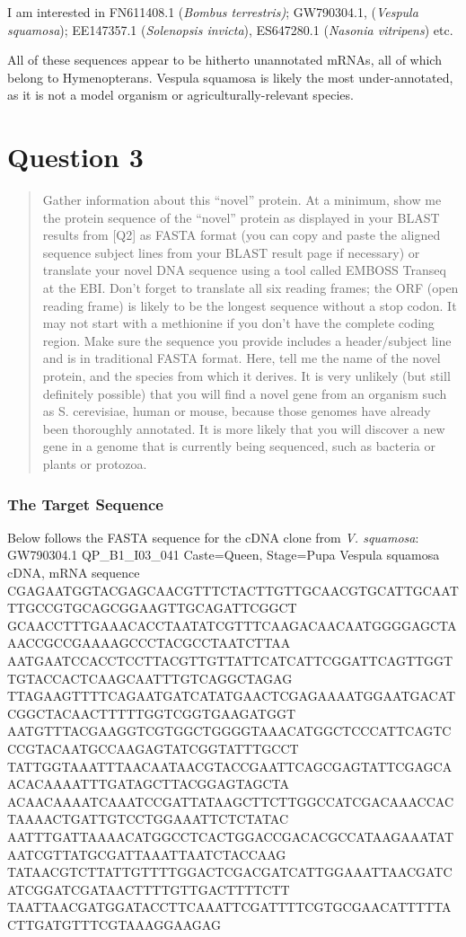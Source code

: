 \documentclass[]{article}
\begin{document}
I am interested in FN611408.1 (\emph{Bombus terrestris)}; GW790304.1,
(\emph{Vespula squamosa}); EE147357.1 (\emph{Solenopsis invicta}),
ES647280.1 (\emph{Nasonia vitripens}) etc.

All of these sequences appear to be hitherto unannotated mRNAs, all of
which belong to Hymenopterans. Vespula squamosa is likely the most
under-annotated, as it is not a model organism or
agriculturally-relevant species.

\section{Question 3}\label{question-3}

\begin{quote}
Gather information about this ``novel'' protein. At a minimum, show me
the protein sequence of the ``novel'' protein as displayed in your BLAST
results from {[}Q2{]} as FASTA format (you can copy and paste the
aligned sequence subject lines from your BLAST result page if necessary)
or translate your novel DNA sequence using a tool called EMBOSS Transeq
at the EBI. Don't forget to translate all six reading frames; the ORF
(open reading frame) is likely to be the longest sequence without a stop
codon. It may not start with a methionine if you don't have the complete
coding region. Make sure the sequence you provide includes a
header/subject line and is in traditional FASTA format. Here, tell me
the name of the novel protein, and the species from which it derives. It
is very unlikely (but still definitely possible) that you will find a
novel gene from an organism such as S. cerevisiae, human or mouse,
because those genomes have already been thoroughly annotated. It is more
likely that you will discover a new gene in a genome that is currently
being sequenced, such as bacteria or plants or protozoa.
\end{quote}

\subsubsection{The Target Sequence}\label{the-target-sequence}

Below follows the FASTA sequence for the cDNA clone from \emph{V.
squamosa}: GW790304.1 QP\_B1\_I03\_041 Caste=Queen, Stage=Pupa Vespula
squamosa cDNA, mRNA sequence
CGAGAATGGTACGAGCAACGTTTCTACTTGTTGCAACGTGCATTGCAATTTGCCGTGCAGCGGAAGTTGCAGATTCGGCT
GCAACCTTTGAAACACCTAATATCGTTTCAAGACAACAATGGGGAGCTAAACCGCCGAAAAGCCCTACGCCTAATCTTAA
AATGAATCCACCTCCTTACGTTGTTATTCATCATTCGGATTCAGTTGGTTGTACCACTCAAGCAATTTGTCAGGCTAGAG
TTAGAAGTTTTCAGAATGATCATATGAACTCGAGAAAATGGAATGACATCGGCTACAACTTTTTGGTCGGTGAAGATGGT
AATGTTTACGAAGGTCGTGGCTGGGGTAAACATGGCTCCCATTCAGTCCCGTACAATGCCAAGAGTATCGGTATTTGCCT
TATTGGTAAATTTAACAATAACGTACCGAATTCAGCGAGTATTCGAGCAACACAAAATTTGATAGCTTACGGAGTAGCTA
ACAACAAAATCAAATCCGATTATAAGCTTCTTGGCCATCGACAAACCACTAAAACTGATTGTCCTGGAAATTCTCTATAC
AATTTGATTAAAACATGGCCTCACTGGACCGACACGCCATAAGAAATATAATCGTTATGCGATTAAATTAATCTACCAAG
TATAACGTCTTATTGTTTTGGACTCGACGATCATTGGAAATTAACGATCATCGGATCGATAACTTTTGTTGACTTTTCTT
TAATTAACGATGGATACCTTCAAATTCGATTTTCGTGCGAACATTTTTACTTGATGTTTCGTAAAGGAAGAG
\end{document}
